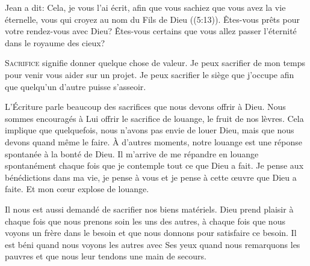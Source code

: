 Jean a dit: 
 \Og Cela, je vous l'ai écrit, afin que vous sachiez que vous avez
 la vie éternelle, vous qui croyez au nom du Fils de Dieu \Fg{}
 ((5:13)).
 Êtes-vous prêts pour votre rendez-vous avec Dieu?
 Êtes-vous certains que vous allez passer l'éternité
 dans le royaume des cieux? 

\dvrule






\lettrine{S}{acrifice} signifie donner quelque chose de valeur.
 Je peux sacrifier de mon temps pour venir vous aider sur un projet.
 Je peux sacrifier le siège que j'occupe afin que quelqu'un d'autre
 puisse s'asseoir. 

L'Écriture parle beaucoup des sacrifices que nous devons offrir à Dieu.
 Nous sommes encouragés à Lui offrir le sacrifice de louange,
 le fruit de nos lèvres. Cela implique que quelquefois, nous n'avons pas envie
 de louer Dieu, mais que nous devons quand même le faire.
 À d'autres moments, notre louange est une réponse spontanée
 à la bonté de Dieu. Il m'arrive de me répandre en louange spontanément
 chaque fois que je contemple tout ce que Dieu a fait.
 Je pense aux bénédictions dans ma vie, je pense à vous et je pense
 à cette \oe{}uvre que Dieu a faite. Et mon c\oe{}ur explose de louange. 

Il nous est aussi demandé de sacrifier nos biens matériels.
 Dieu prend plaisir à chaque fois que nous prenons soin les uns des autres,
 à chaque fois que nous voyons un frère dans le besoin et que nous donnons
 pour satisfaire ce besoin. Il est béni quand nous voyons les autres
 avec Ses yeux \ocadr quand nous remarquons les pauvres
 et que nous leur tendons une main de secours. 


